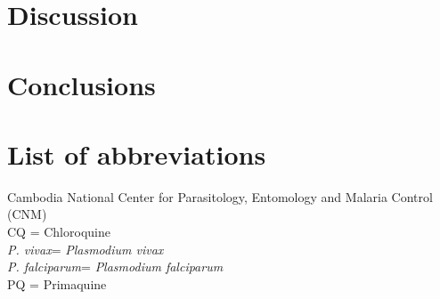 \documentclass[doublespacing]{bmcart}
\newcommand{\pv}{\textit{P. vivax}}
\newcommand{\pf}{\textit{P. falciparum}}
\begin{document}
\section*{Discussion}

\section*{Conclusions}

\section*{List of abbreviations}
Cambodia National Center for Parasitology, Entomology and Malaria Control (CNM)\\
CQ = Chloroquine \\
\pv = \textit{Plasmodium vivax} \\
\pf = \textit{Plasmodium falciparum} \\
PQ = Primaquine \\


\end{document}
